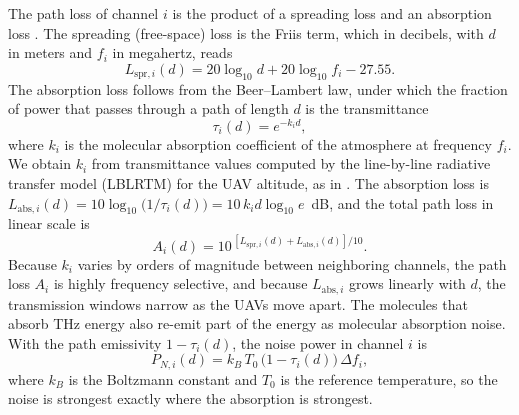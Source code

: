 \documentclass{ieee-ojvt}
\begin{document}
The path loss of channel $i$ is the product of a spreading loss and an absorption loss
\cite{jornet2011channel}. The spreading (free-space) loss is the Friis term, which in
decibels, with $d$ in meters and $f_i$ in megahertz, reads
\begin{equation}
L_{\mathrm{spr},i}(d)=20\log_{10}d+20\log_{10}f_i-27.55 .
\label{eq:spread}
\end{equation}
The absorption loss follows from the Beer--Lambert law, under which the fraction of power
that passes through a path of length $d$ is the transmittance
\begin{equation}
\tau_i(d)=e^{-k_i d},
\label{eq:tau}
\end{equation}
where $k_i$ is the molecular absorption coefficient of the atmosphere at frequency $f_i$.
We obtain $k_i$ from transmittance values computed by the line-by-line radiative transfer
model (LBLRTM) \cite{clough2005aer} for the UAV altitude, as in
\cite{10399804}. The absorption loss is
$L_{\mathrm{abs},i}(d)=10\log_{10}\!\big(1/\tau_i(d)\big)=10\,k_i d\log_{10}e$~dB, and the
total path loss in linear scale is
\begin{equation}
A_i(d)=10^{\,[L_{\mathrm{spr},i}(d)+L_{\mathrm{abs},i}(d)]/10}.
\label{eq:pathloss}
\end{equation}
Because $k_i$ varies by orders of magnitude between neighboring channels, the path loss
$A_i$ is highly frequency selective, and because $L_{\mathrm{abs},i}$ grows linearly with
$d$, the transmission windows narrow as the UAVs move apart. The molecules that absorb THz
energy also re-emit part of the energy as molecular absorption noise. With the path
emissivity $1-\tau_i(d)$, the noise power in channel $i$ is \cite{jornet2011channel}
\begin{equation}
P_{N,i}(d)=k_B\,T_0\,\big(1-\tau_i(d)\big)\,\Delta f_i ,
\label{eq:noise}
\end{equation}
where $k_B$ is the Boltzmann constant and $T_0$ is the reference temperature, so the
noise is strongest exactly where the absorption is strongest.
\end{document}
